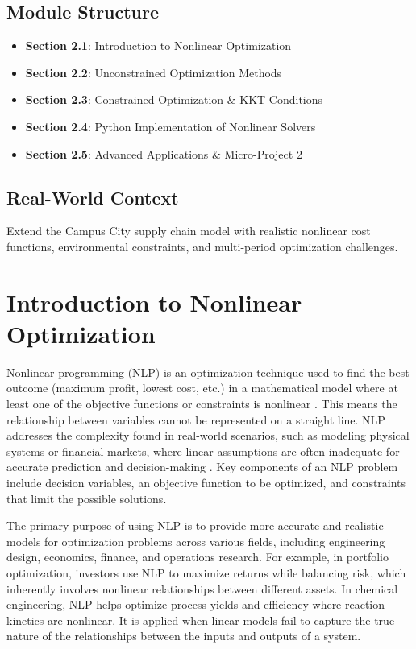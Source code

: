 \documentclass[
  letterpaper,
  DIV=11,
  numbers=noendperiod]{scrreprt}
\providecommand{\tightlist}{%
  \setlength{\itemsep}{0pt}\setlength{\parskip}{0pt}}
\begin{document}
\subsection{Module Structure}\label{module-structure}

\begin{itemize}
\tightlist
\item
  \textbf{Section 2.1}: Introduction to Nonlinear Optimization
\item
  \textbf{Section 2.2}: Unconstrained Optimization Methods\\
\item
  \textbf{Section 2.3}: Constrained Optimization \& KKT Conditions
\item
  \textbf{Section 2.4}: Python Implementation of Nonlinear Solvers
\item
  \textbf{Section 2.5}: Advanced Applications \& Micro-Project 2
\end{itemize}

\subsection{Real-World Context}\label{real-world-context}

Extend the Campus City supply chain model with realistic nonlinear cost
functions, environmental constraints, and multi-period optimization
challenges.

\section{Introduction to Nonlinear
Optimization}\label{introduction-to-nonlinear-optimization}

Nonlinear programming (NLP) is an optimization technique used to find
the best outcome (maximum profit, lowest cost, etc.) in a mathematical
model where at least one of the objective functions or constraints is
nonlinear . This means the relationship between variables cannot be
represented on a straight line. NLP addresses the complexity found in
real-world scenarios, such as modeling physical systems or financial
markets, where linear assumptions are often inadequate for accurate
prediction and decision-making . Key components of an NLP problem
include decision variables, an objective function to be optimized, and
constraints that limit the possible solutions.

The primary purpose of using NLP is to provide more accurate and
realistic models for optimization problems across various fields,
including engineering design, economics, finance, and operations
research. For example, in portfolio optimization, investors use NLP to
maximize returns while balancing risk, which inherently involves
nonlinear relationships between different assets. In chemical
engineering, NLP helps optimize process yields and efficiency where
reaction kinetics are nonlinear. It is applied when linear models fail
to capture the true nature of the relationships between the inputs and
outputs of a system.
\end{document}

